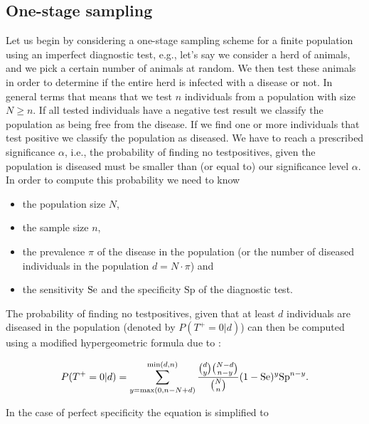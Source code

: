 \documentclass[nojss]{jss}
\newcommand{\Sp}{\mbox{Sp}}
\begin{document}

\subsection{One-stage sampling} 
\label{subsec:1-stage-sampling} 

Let us begin by considering a one-stage sampling scheme for a finite 
population using an imperfect diagnostic test, e.g., let's say we 
consider a herd of animals, and we pick a certain number of animals 
at random. We then test these animals in order to determine if the 
entire herd is infected with a disease or not. In general terms that 
means that we test $n$ individuals from a population with size $N 
\geq n$. If all tested individuals have a negative test result we 
classify the population as being free from the disease. If we find 
one or more individuals that test positive we classify the 
population as diseased. We have to reach a prescribed significance 
$\alpha$, i.e., the probability of finding no testpositives, given 
the population is diseased must be smaller than (or equal to) our 
significance level $\alpha$. In order to compute this probability we 
need to know 

\begin{itemize} \item the population size $N$, \item the sample size 
$n$, \item the prevalence $\pi$ of the disease in the population (or 
the 
      number of diseased individuals in the population $d = N\cdot\pi$) and
\item the sensitivity $\mbox{Se}$ and the specificity $\Sp$ of the diagnostic test.
\end{itemize}

The probability of finding no testpositives, given that at least $d$ 
individuals are diseased in the population (denoted by $P(T^+=0|d)$) 
can then be computed using a modified hypergeometric formula due to 
\cite{CaBa98A}:

\begin{equation}
\label{eq:hypergeom_senspec_T0} 
% 
P(T^+=0|d) = \sum_{y = \max(0,n-N+d)}^{\min(d,n)} \frac{{d \choose 
y}{N-d \choose n-y}}{{N \choose n}} (1-\Se)^y \Sp^{n-y}. 
% 
\end{equation} 

In the case of perfect specificity the equation is simplified to 
 
\end{document}
